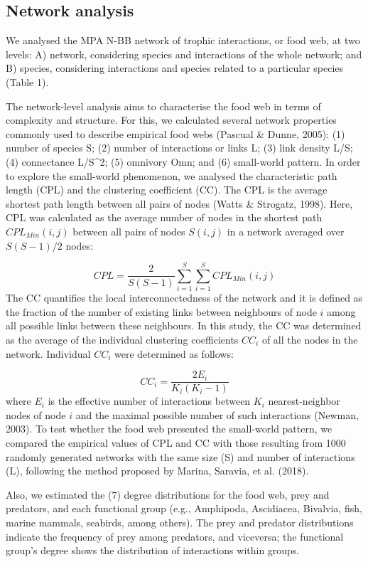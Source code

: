 \documentclass[preprint, 3p,
authoryear]{elsarticle} %
\begin{document}
\hypertarget{network-analysis}{%
\subsection{Network analysis}\label{network-analysis}}

We analysed the MPA N-BB network of trophic interactions, or food web,
at two levels: A) network, considering species and interactions of the
whole network; and B) species, considering interactions and species
related to a particular species (Table 1).

The network-level analysis aims to characterise the food web in terms of
complexity and structure. For this, we calculated several network
properties commonly used to describe empirical food webs (Pascual \&
Dunne, 2005): (1) number of species S; (2) number of interactions or
links L; (3) link density L/S; (4) connectance L/S\^{}2; (5) omnivory
Omn; and (6) small-world pattern. In order to explore the small-world
phenomenon, we analysed the characteristic path length (CPL) and the
clustering coefficient (CC). The CPL is the average shortest path length
between all pairs of nodes (Watts \& Strogatz, 1998). Here, CPL was
calculated as the average number of nodes in the shortest path
\(CPL_{Min} (i,j)\) between all pairs of nodes \(S(i,j)\) in a network
averaged over \(S(S-1)/2\) nodes:

\[
CPL = \frac{2}{S(S-1)} \sum_{i = 1}^{S} \sum_{i = 1}^{S} {CPL_{Min}(i,j)}
\] The CC quantifies the local interconnectedness of the network and it
is defined as the fraction of the number of existing links between
neighbours of node \(i\) among all possible links between these
neighbours. In this study, the CC was determined as the average of the
individual clustering coefficients \(CC_i\) of all the nodes in the
network. Individual \(CC_i\) were determined as follows:

\[
CC_i = \frac{2E_i}{K_i(K_i-1)}
\] where \(E_i\) is the effective number of interactions between \(K_i\)
nearest-neighbor nodes of node \(i\) and the maximal possible number of
such interactions (Newman, 2003). To test whether the food web presented
the small-world pattern, we compared the empirical values of CPL and CC
with those resulting from 1000 randomly generated networks with the same
size (S) and number of interactions (L), following the method proposed
by Marina, Saravia, et al. (2018).

Also, we estimated the (7) degree distributions for the food web, prey
and predators, and each functional group (e.g., Amphipoda, Ascidiacea,
Bivalvia, fish, marine mammals, seabirds, among others). The prey and
predator distributions indicate the frequency of prey among predators,
and viceversa; the functional group's degree shows the distribution of
interactions within groups.
\end{document}
